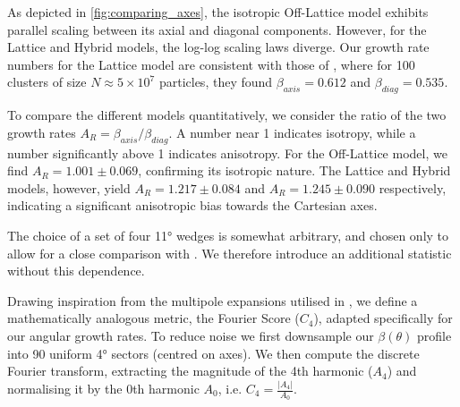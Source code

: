 \documentclass[12pt, a4paper, oneside]{report}
\theoremstyle{remark}
\begin{document}
As depicted in \cref{fig:comparing_axes}, the isotropic Off-Lattice model exhibits parallel scaling between its axial and diagonal components. However, for the Lattice and Hybrid models, the log-log scaling laws diverge. 
Our growth rate numbers for the Lattice model are consistent with those of \cite{Grebenkov2017}, where for 100 clusters of size $N \approx 5 \times 10^7$ particles, they found $\beta_{axis} = 0.612$ and $\beta_{diag} = 0.535$. %

To compare the different models quantitatively, we consider the ratio of the two growth rates $A_R=\beta_{axis}/\beta_{diag}$. A number near 1 indicates isotropy, while a number significantly above 1 indicates anisotropy. For the Off-Lattice model, we find $A_R = 1.001 \pm 0.069$, confirming its isotropic nature. The Lattice and Hybrid models, however, yield $A_R = 1.217 \pm 0.084$ and $A_R = 1.245 \pm 0.090$ respectively, indicating a significant anisotropic bias towards the Cartesian axes.

The choice of a set of four 11° wedges is somewhat arbitrary, and chosen only to allow for a close comparison with \cite{Grebenkov2017}. We therefore introduce an additional statistic without this dependence. 

Drawing inspiration from the multipole expansions utilised in \cite{Ball2002}, we define a mathematically analogous metric, the Fourier Score ($C_4$), adapted specifically for our angular growth rates. To reduce noise we first downsample our $\beta(\theta)$ profile into 90 uniform 4° sectors (centred on axes). We then compute the discrete Fourier transform, extracting the magnitude of the 4th harmonic ($A_4$) and normalising it by the 0th harmonic $A_0$, i.e. $C_4 = \frac{|A_4|}{A_0}$. 
\end{document}
